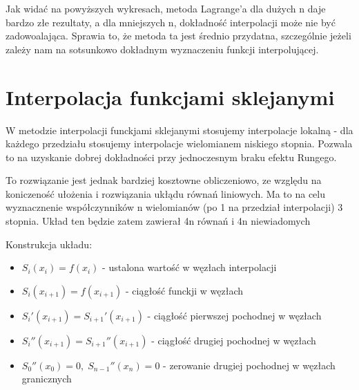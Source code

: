 \documentclass[fleqn]{article}
\begin{document}
    \noindent Jak widać na powyższych wykresach, metoda Lagrange'a dla dużych n daje bardzo złe rezultaty, a dla mniejszych n, dokładność interpolacji może nie być zadowoalająca.
    Sprawia to, że metoda ta jest średnio przydatna, szczególnie jeżeli zależy nam na sotsunkowo dokładnym wyznaczeniu funkcji interpolującej.

\newpage
\section{Interpolacja funkcjami sklejanymi}
    W metodzie interpolacji funckjami sklejanymi stosujemy interpolacje lokalną - dla każdego przedziału stosujemy interpolacje wielomianem niskiego stopnia.
    Pozwala to na uzyskanie dobrej dokładności przy jednoczesnym braku efektu Rungego.

    \noindent To rozwiązanie jest jednak bardziej kosztowne obliczeniowo, ze względu na koniczeność ułożenia i rozwiązania ukłądu równań liniowych. 
    Ma to na celu wyznacznenie współczynników n wielomianów (po 1 na przedział interpolacji) 3 stopnia. Układ ten będzie zatem zawierał 4n równań i 4n niewiadomych

    \noindent Konstrukcja układu:
    \begin{itemize}
        \item $S_i(x_i) = f(x_i)$ - ustalona wartość w węzłach interpolacji
        \item $S_i(x_{i+1}) = f(x_{i+1})$ - ciągłość funckji w węzłach
        \item $S_i'(x_{i+1}) = S_{i+1}'(x_{i+1})$ - ciągłość pierwszej pochodnej w węzłach
        \item $S_i''(x_{i+1}) = S_{i+1}''(x_{i+1})$ - ciągłość drugiej pochodnej w węzłach
        \item $S_0''(x_0) = 0, \; S_{n-1}''(x_n) = 0 $ - zerowanie drugiej pochodnej w węzłach granicznych
    \end{itemize}
\end{document}

